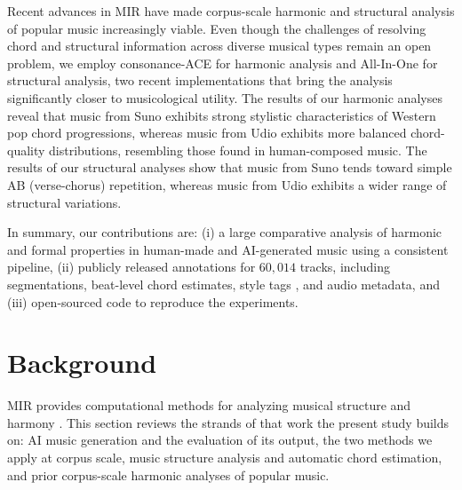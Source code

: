 \documentclass{article}
\newcommand{\rev}[1]{{\color{r2}#1}} %
\begin{document}
Recent advances in MIR have made corpus-scale harmonic and structural analysis of popular music increasingly viable. Even though the challenges of resolving chord and structural information across diverse musical types remain an open problem, we employ consonance-ACE \citep{poltronieri2025discord} for harmonic analysis and All-In-One \citep{taejun2023allinone} for structural analysis, two recent implementations that bring the analysis significantly closer to musicological utility. The results of our harmonic analyses reveal that music from Suno exhibits strong stylistic characteristics of Western pop chord progressions, whereas music from Udio exhibits more balanced chord-quality distributions, resembling those found in human-composed music. The results of our structural analyses show that music from Suno tends toward simple AB (verse-chorus) repetition, whereas music from Udio exhibits a wider range of structural variations.

In summary, our contributions are:
(i) a large comparative analysis of harmonic and formal properties in human-made and AI-generated music using a consistent pipeline,
(ii) publicly released annotations for $60,014$ tracks, including segmentations, beat-level chord estimates, style tags \citep{oramas2018multimodal}, and audio metadata, and (iii) open-sourced code to reproduce the experiments.

\section{Background}
\label{sec:background}

\rev{MIR provides computational methods for analyzing musical structure and harmony \citep{Muller2015a}. This section reviews the strands of that work the present study builds on: AI music generation and the evaluation of its output, the two methods we apply at corpus scale, music structure analysis and automatic chord estimation, and prior corpus-scale harmonic analyses of popular music.}
\end{document}
